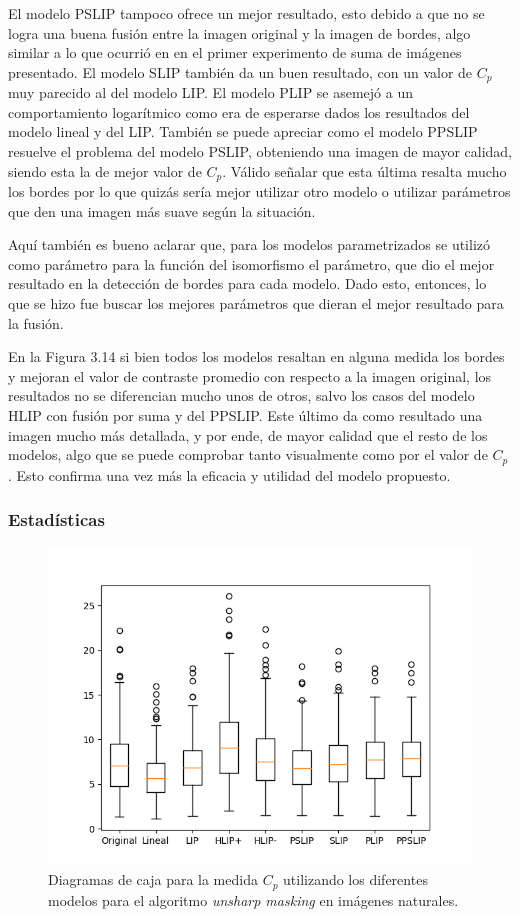 El modelo PSLIP tampoco ofrece un mejor resultado, esto debido a que no se logra una buena fusi\'on entre la imagen original y la imagen de bordes, algo similar a lo que ocurri\'o en en el primer experimento de suma de im\'agenes presentado. El modelo SLIP tambi\'en da un buen resultado, con un valor de $C_p$ muy parecido al del modelo LIP. El modelo PLIP se asemej\'o a un comportamiento logar\'itmico como era de esperarse dados los resultados del modelo lineal y del LIP. Tambi\'en se puede apreciar como el modelo PPSLIP resuelve el problema del modelo PSLIP, obteniendo una imagen de mayor calidad, siendo esta la de mejor valor de $C_p$. V\'alido se\~nalar que esta \'ultima resalta mucho los bordes por lo que quiz\'as ser\'ia mejor utilizar otro modelo o utilizar par\'ametros que den una imagen m\'as suave seg\'un la situaci\'on.

Aqu\'i tambi\'en es bueno aclarar que, para los modelos parametrizados se utiliz\'o como par\'ametro para la funci\'on del isomorfismo el par\'ametro, que dio el mejor resultado en la detecci\'on de bordes para cada modelo. Dado esto, entonces, lo que se hizo fue buscar los mejores par\'ametros que dieran el mejor resultado para la fusi\'on.

En la Figura 3.14 si bien todos los modelos resaltan en alguna medida los bordes y mejoran el valor de contraste promedio con respecto a la imagen original, los resultados no se diferencian mucho unos de otros, salvo los casos del modelo HLIP con fusi\'on por suma y del PPSLIP. Este \'ultimo da como resultado una imagen mucho m\'as detallada, y por ende, de mayor calidad que el resto de los modelos, algo que se puede comprobar tanto visualmente como por el valor de $C_p$. Esto confirma una vez m\'as la eficacia y utilidad del modelo propuesto.

\subsubsection{Estad\'isticas}

\begin{figure}[h]
	\begin{center}
		\includegraphics[width=10.0 cm]{images/graphics/natural/unsharp_masking/um_all.png}
		\caption{Diagramas de caja para la medida $C_p$ utilizando los diferentes modelos para el algoritmo \textit{unsharp masking} en im\'agenes naturales.}
	\end{center}
\end{figure}

